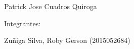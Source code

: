 \documentclass[12pt,letterpaper]{article}
\begin{document}
\begin{titlepage}
\begin{center}
\vspace*{0.1in}
\begin{large}
 Patrick Jose Cuadros Quiroga\\
\end{large}

\vspace*{0.2in}
\vspace*{0.1in}
\begin{large}
Integrantes: \\
\begin{flushleft}


Zuñiga Silva, Roby Gerson  	           \hfill	(2015052684) \\


\end{flushleft}
\end{large}
\end{center}

\end{titlepage}
\end{document}
